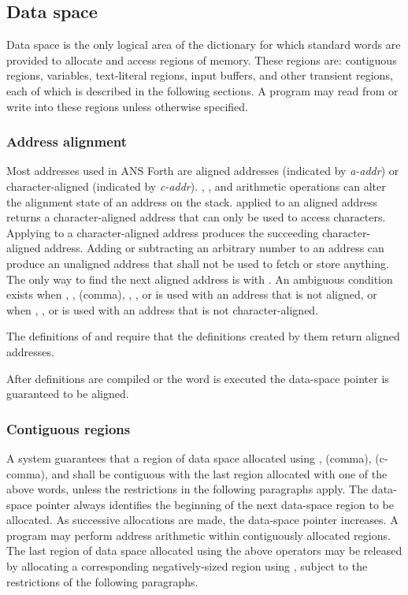 \subsection{Data space} %
\label{usage:dataspace}

Data space is the only logical area of the dictionary for which
standard words are provided to allocate and access regions of
memory. These regions are: contiguous regions, variables,
text-literal regions, input buffers, and other transient regions,
each of which is described in the following sections. A program may
read from or write into these regions unless otherwise specified.

\subsubsection{Address alignment} %
\label{usage:aaddr}

Most addresses used in ANS Forth are aligned addresses (indicated
by \emph{a-addr}) or character-aligned (indicated by \emph{c-addr}).
, , and arithmetic operations can alter
the alignment state of an address on the stack.  applied
to an aligned address returns a character-aligned address that can
only be used to access characters. Applying  to a
character-aligned address produces the succeeding character-aligned
address. Adding or subtracting an arbitrary number to an address can
produce an unaligned address that shall not be used to fetch or
store anything. The only way to find the next aligned address is
with . An ambiguous condition exists when
, \word{!}, \word{,} (comma), \word{+!}, , or
 is used with an address that is not aligned, or when
, , or  is used with an address that is
not character-aligned.

The definitions of  and
 require that the definitions created
by them return aligned addresses.

After definitions are compiled or the word  is executed
the data-space pointer is guaranteed to be aligned.

\subsubsection{Contiguous regions} %
\label{usage:contiguous}

A system guarantees that a region of data space allocated using
, \word{,} (comma),  (c-comma), and
 shall be contiguous with the last region allocated
with one of the above words, unless the restrictions in the
following paragraphs apply. The data-space pointer 
always identifies the beginning of the next data-space region to be
allocated. As successive allocations are made, the data-space
pointer increases. A program may perform address arithmetic within
contiguously allocated regions. The last region of data space
allocated using the above operators may be released by allocating a
corresponding negatively-sized region using , subject
to the restrictions of the following paragraphs.

